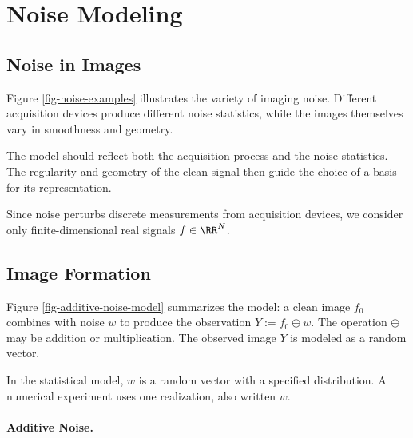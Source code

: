 \section{Noise Modeling}

                                                     
\subsection{Noise in Images}

Figure \ref{fig-noise-examples} illustrates the variety of imaging noise. Different acquisition devices produce different noise statistics, while the images themselves vary in smoothness and geometry.


The model should reflect both the acquisition process and the noise statistics. The regularity and geometry of the clean signal then guide the choice of a basis for its representation.

Since noise perturbs discrete measurements from acquisition devices, we consider only finite-dimensional real signals $f\in\RR^N$.

                                                     
\subsection{Image Formation}
\label{subsec-image-formation}

Figure \ref{fig-additive-noise-model} summarizes the model: a clean image $f_0$ combines with noise $w$ to produce the observation $Y := f_0 \oplus w$. The operation $\oplus$ may be addition or multiplication. The observed image $Y$ is modeled as a random vector.


In the statistical model, $w$ is a random vector with a specified distribution. A numerical experiment uses one realization, also written $w$.

  
\paragraph{Additive Noise.}

